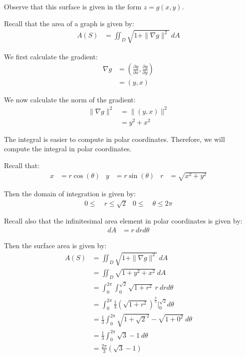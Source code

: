 \begin{solution}
    Observe that this surface is given in the form \(z = g(x, y)\). 
    
    Recall that the area of a graph is given by:
    \begin{align}
        A(S) &= \iint_D \sqrt{1 + \|\nabla g\|^2} \ dA
    \end{align}
    
    We first calculate the gradient:
    \begin{align}
        \nabla g &= \left(\frac{\partial g}{\partial x}, \frac{\partial g}{\partial y}\right) \\
        &= \left(y, x\right)
    \end{align}
    
    We now calculate the norm of the gradient:
    \begin{align}
        \|\nabla g\|^2 &= \|\left(y, x\right)\|^2 \\
        &= y^2 + x^2
    \end{align}
    
    The integral is easier to compute in polar coordinates. Therefore, we will compute the integral in polar coordinates.
    
    Recall that:
    \begin{align}
        x &= r\cos(\theta) & y &= r\sin(\theta) & r &= \sqrt{x^2 + y^2}
    \end{align}
    
    Then the domain of integration is given by:
    \begin{align}
        0 \leq & \ r \leq \sqrt{2} & 0 \leq & \ \theta \leq 2\pi
    \end{align}
    
    Recall also that the infinitesimal area element in polar coordinates is given by:
    \begin{align}
        dA &= r \ dr d\theta
    \end{align}
    
    Then the surface area is given by:
    \begin{align}
        A(S) &= \iint_D \sqrt{1 + \|\nabla g\|^2} \ dA \\
        &= \iint_D \sqrt{1 + y^2 + x^2} \ dA \\
        &= \int_0^{2\pi} \int_0^{\sqrt{2}} \sqrt{1 + r^2} \ r \ dr d\theta \\
        &= \int_0^{2\pi} \frac{1}{3}\left(\sqrt{1 + r^2}\right)^{\frac{3}{2}}\Biggr|_0^{\sqrt{2}} d\theta \\
        &= \frac{1}{3}\int_0^{2\pi} \sqrt{1 + \sqrt{2}^2} - \sqrt{1 + 0^2} \ d\theta \\
        &= \frac{1}{3} \int_0^{2\pi} \sqrt{3} - 1 \ d\theta \\
        &= \frac{2\pi}{3} \left(\sqrt{3} - 1\right)
    \end{align}
\end{solution}

